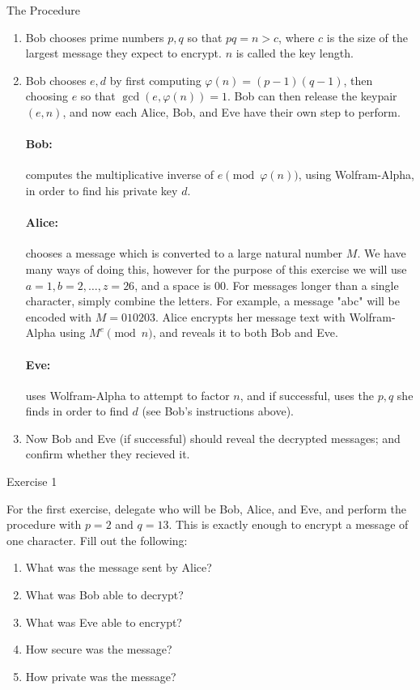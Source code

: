\documentclass{article}
\begin{document}
    \huge The Procedure
    \normalsize
    \bigskip
    \begin{enumerate}
\item Bob chooses prime numbers $p,q$ so that $pq=n>c$, where $c$ is the size of the largest message they expect to encrypt. $n$ is called the key length.

\item Bob chooses $e,d$ by first computing $\varphi(n)=(p-1)(q-1)$, then choosing $e$ so that $\gcd(e,\varphi(n))=1$. Bob can then release the keypair $(e,n)$, and now each Alice, Bob, and Eve have their own step to perform.
    
    \paragraph{Bob:} computes the multiplicative inverse of $e\pmod{\varphi(n)}$, using Wolfram-Alpha, in order to find his private key $d$.

    \paragraph{Alice:} chooses a message which is converted to a large natural number $M$. We have many ways of doing this, however for the purpose of this exercise we will use $a=1, b=2,\dots, z=26$, and a space is $00$. For messages longer than a single character, simply combine the letters. For example, a message "abc" will be encoded with $M=010203$. Alice encrypts her message text with Wolfram-Alpha using $M^e\pmod{n}$, and reveals it to both Bob and Eve.

    \paragraph{Eve:} uses Wolfram-Alpha to attempt to factor $n$, and if successful, uses the $p,q$ she finds in order to find $d$ (see Bob's instructions above).

\item Now Bob and Eve (if successful) should reveal the decrypted messages; and confirm whether they recieved it.
\end{enumerate}

\newpage

    \huge Exercise 1
    \normalsize

    For the first exercise, delegate who will be Bob, Alice, and Eve, and perform the procedure with $p=2$ and $q=13$. This is exactly enough to encrypt a message of one character. Fill out the following:
    \begin{enumerate}
        \item What was the message sent by Alice? 
        \item What was Bob able to decrypt?
        \item What was Eve able to encrypt?
        \item How secure was the message?
        \item How private was the message?
    \end{enumerate}
\end{document}
